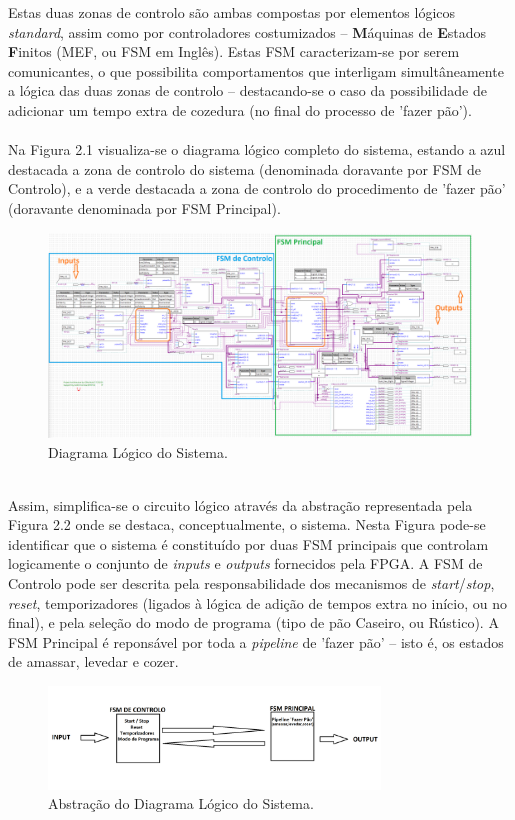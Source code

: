 \documentclass{report}
\begin{document}
Estas duas zonas de controlo são ambas compostas por elementos lógicos \textit{standard}, assim como por controladores costumizados -- \textbf{M}áquinas de \textbf{E}stados \textbf{F}initos (MEF, ou FSM em Inglês). Estas FSM caracterizam-se por serem comunicantes, o que possibilita comportamentos que interligam simultâneamente a lógica das duas zonas de controlo -- destacando-se o caso da possibilidade de adicionar um tempo extra de cozedura (no final do processo de 'fazer pão').
\\\\
Na Figura 2.1 visualiza-se o diagrama lógico completo do sistema, estando a azul destacada a zona de controlo do sistema (denominada doravante por FSM de Controlo), e a verde destacada a zona de controlo do procedimento de 'fazer pão' (doravante denominada por FSM Principal).
\begin{figure}[h!] %
	\center
	\includegraphics[width=335pt]{images/fase2v9_2}
	\caption{Diagrama Lógico do Sistema.}
	\label{fig:imagem1}
\end{figure}
\\
Assim, simplifica-se o circuito lógico através da abstração representada pela Figura 2.2 onde se destaca, conceptualmente, o sistema. Nesta Figura pode-se identificar que o sistema é constituído por duas FSM principais que controlam logicamente o conjunto de \textit{inputs} e \textit{outputs} fornecidos pela FPGA. A FSM de Controlo pode ser descrita pela responsabilidade dos mecanismos de \textit{start}/\textit{stop}, \textit{reset}, temporizadores (ligados à lógica de adição de tempos extra no início, ou no final), e pela seleção do modo de programa (tipo de pão Caseiro, ou Rústico). A FSM Principal é reponsável por toda a \textit{pipeline} de 'fazer pão' -- isto é, os estados de amassar, levedar e cozer.
\begin{figure}[h!] %
	\center
	\includegraphics[width=250pt]{images/SistemaAbstrato_2}
	\caption{Abstração do Diagrama Lógico do Sistema.}
	\label{fig:imagem2}
\end{figure}
\end{document}
